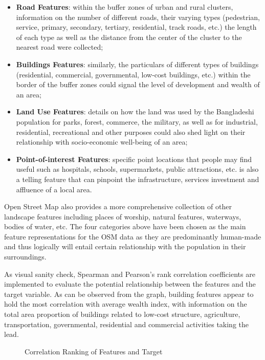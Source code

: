 \documentclass[solid,math,chem,code,plot,gloss]{bmc}
\begin{document}
\begin{itemize}
    \item \textbf{Road Features}: within the buffer zones of urban and rural clusters, information on the number of different roads, their varying types (pedestrian, service, primary, secondary, tertiary, residential, track roads, etc.) the length of each type as well as the distance from the center of the cluster to the nearest road were collected; 
    \item \textbf{Buildings Features}: similarly, the particulars of different types of buildings (residential, commercial, governmental, low-cost buildings, etc.) within the border of the buffer zones could signal the level of development and wealth of an area; 
    \item \textbf{Land Use Features}: details on how the land was used by the Bangladeshi population for parks, forest, commerce, the military, as well as for industrial, residential, recreational and other purposes could also shed light on their relationship with socio-economic well-being of an area;
    \item \textbf{Point-of-interest Features}: specific point locations that people may find useful such as hospitals, schools, supermarkets, public attractions, etc. is also a telling feature that can pinpoint the infrastructure, services investment and affluence of a local area. 
\end{itemize}

Open Street Map also provides a more comprehensive collection of other landscape features including places of worship, natural features, waterways, bodies of water, etc. The four categories above have been chosen as the main feature representations for the OSM data as they are predominantly human-made and thus logically will entail certain relationship with the population in their surroundings.  

As visual sanity check, Spearman and Pearson's rank correlation coefficients are implemented to evaluate the potential relationship between the features and the target variable. As can be observed from the graph, building features appear to hold the most correlation with average wealth index, with information on the total area proportion of buildings related to low-cost structure, agriculture, transportation, governmental, residential and commercial activities taking the lead. 

\begin{figure}[hbt!]
  \centering
  \hfill
  \caption{Correlation Ranking of Features and Target}
\end{figure}
\end{document}
